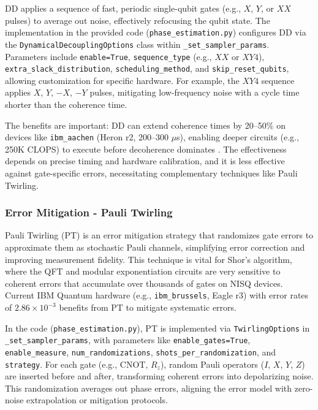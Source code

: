 \documentclass[conference,twoside]{IEEEtran}
\begin{document}
DD applies a sequence of fast, periodic single-qubit gates (e.g., \(X\), \(Y\), or \(XX\) pulses) to average out noise, effectively refocusing the qubit state. The implementation in the provided  code (\texttt{phase\_estimation.py}) configures DD via the \texttt{DynamicalDecouplingOptions} class within \texttt{\_set\_sampler\_params}. Parameters include \texttt{enable=True}, \texttt{sequence\_type} (e.g., \(XX\) or \(XY4\)), \texttt{extra\_slack\_distribution}, \texttt{scheduling\_method}, and \texttt{skip\_reset\_qubits}, allowing customization for specific hardware. For example, the \(XY4\) sequence applies \(X\), \(Y\), \(-X\), \(-Y\) pulses, mitigating low-frequency noise with a cycle time shorter than the coherence time.

The benefits are important: DD can extend coherence times by 20–50\% on devices like \texttt{ibm\_aachen} (Heron r2, 200–300 \(\mu\)s), enabling deeper circuits (e.g., 250K CLOPS) to execute before decoherence dominates \citep*{niu2022} \citep*{tong2025}. The effectiveness depends on precise timing and hardware calibration, and it is less effective against gate-specific errors, necessitating complementary techniques like Pauli Twirling. \\

\subsubsection{Error Mitigation - Pauli Twirling}
Pauli Twirling (PT) is an error mitigation strategy that randomizes gate errors to approximate them as stochastic Pauli channels, simplifying error correction and improving measurement fidelity\citep*{wallman2016}. This technique is vital for Shor's algorithm, where the QFT and modular exponentiation circuits are very sensitive to coherent errors that accumulate over thousands of gates on NISQ devices. Current IBM Quantum hardware (e.g., \texttt{ibm\_brussels}, Eagle r3) with error rates of \(2.86 \times 10^{-3}\) benefits from PT to mitigate systematic errors.

In the  code (\texttt{phase\_estimation.py}), PT is implemented via \texttt{TwirlingOptions} in \texttt{\_set\_sampler\_params}, with parameters like \texttt{enable\_gates=True}, \texttt{enable\_measure}, \texttt{num\_randomizations}, \texttt{shots\_per\_randomization}, and \texttt{strategy}. For each gate (e.g., CNOT, \(R_z\)), random Pauli operators (\(I\), \(X\), \(Y\), \(Z\)) are inserted before and after, transforming coherent errors into depolarizing noise. This randomization averages out phase errors, aligning the error model with zero-noise extrapolation or mitigation protocols.
\end{document}
